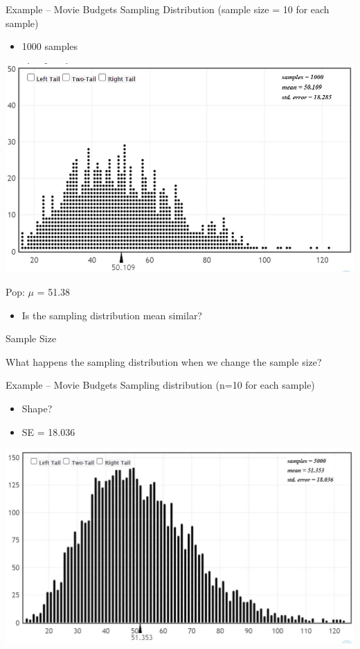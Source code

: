 \documentclass{beamer}
\begin{document}
\begin{frame}{Example -- Movie Budgets}
Sampling Distribution (sample size = 10 for each sample)
\begin{itemize}
    \item 1000 samples
\end{itemize}
\begin{center}
    \includegraphics[scale=.55]{img/budget_dotplot2.jpg}
\end{center}
Pop: $\mu$ = 51.38
\begin{itemize}
    \item Is the sampling distribution mean similar?
\end{itemize}
\end{frame}

\begin{frame}{Sample Size}

What happens the sampling distribution when we change the sample size?

\end{frame}

\begin{frame}{Example -- Movie Budgets}
Sampling distribution (n=10 for each sample)
\begin{itemize}
    \item Shape?
    \item SE = 18.036
\end{itemize}
\begin{center}
    \includegraphics[scale=.6]{img/budgets_n10.jpg}
\end{center}
\end{frame}
\end{document}
